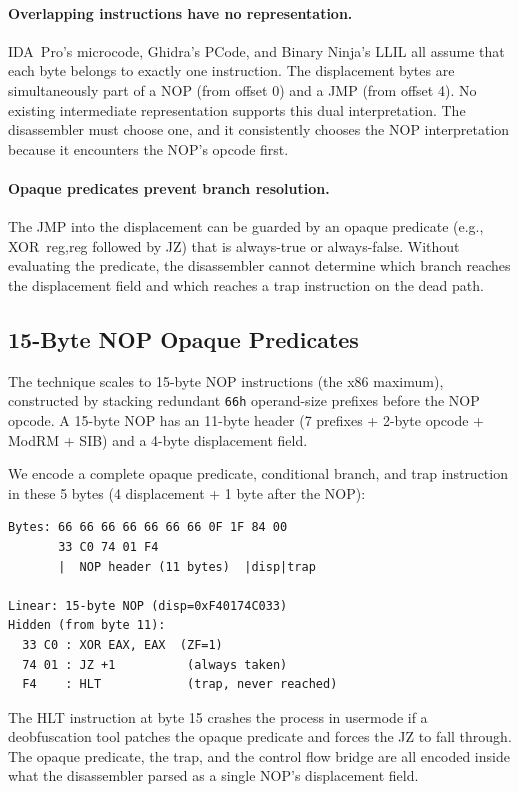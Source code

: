 \documentclass[letterpaper,twocolumn,10pt]{article}
\begin{document}
\paragraph{Overlapping instructions have no representation.} IDA~Pro's microcode, Ghidra's PCode, and Binary Ninja's LLIL all assume that each byte belongs to exactly one instruction. The displacement bytes are simultaneously part of a NOP (from offset 0) and a JMP (from offset 4). No existing intermediate representation supports this dual interpretation. The disassembler must choose one, and it consistently chooses the NOP interpretation because it encounters the NOP's opcode first.

\paragraph{Opaque predicates prevent branch resolution.} The JMP into the displacement can be guarded by an opaque predicate (e.g., XOR~reg,reg followed by JZ) that is always-true or always-false. Without evaluating the predicate, the disassembler cannot determine which branch reaches the displacement field and which reaches a trap instruction on the dead path.

\subsection{15-Byte NOP Opaque Predicates}
\label{sec:nop15}

The technique scales to 15-byte NOP instructions (the x86 maximum), constructed by stacking redundant \texttt{66h} operand-size prefixes before the NOP opcode. A 15-byte NOP has an 11-byte header (7 prefixes + 2-byte opcode + ModRM + SIB) and a 4-byte displacement field.

We encode a complete opaque predicate, conditional branch, and trap instruction in these 5 bytes (4 displacement + 1 byte after the NOP):

\begin{lstlisting}
Bytes: 66 66 66 66 66 66 66 0F 1F 84 00
       33 C0 74 01 F4
       |  NOP header (11 bytes)  |disp|trap

Linear: 15-byte NOP (disp=0xF40174C033)
Hidden (from byte 11):
  33 C0 : XOR EAX, EAX  (ZF=1)
  74 01 : JZ +1          (always taken)
  F4    : HLT            (trap, never reached)
\end{lstlisting}

The HLT instruction at byte 15 crashes the process in usermode if a deobfuscation tool patches the opaque predicate and forces the JZ to fall through. The opaque predicate, the trap, and the control flow bridge are all encoded inside what the disassembler parsed as a single NOP's displacement field.
\end{document}
